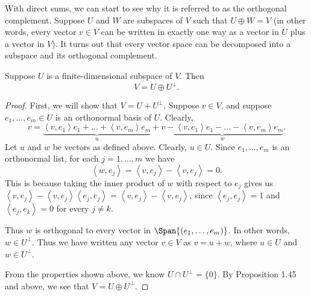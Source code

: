 \documentclass[math0540-lecture-notes.tex]{subfiles}
\begin{document}
With direct sums, we can start to see why it is referred to as the orthogonal complement. Suppose
$U$ and $W$ are subspaces of $V$ such that $U\oplus W=V$ (in other words, every vector $v\in V$ can
be written in exactly one way as a vector in $U$ plus a vector in $V$). It turns out that every
vector space can be decomposed into a subspace and its orthogonal complement.

\begin{theorem}{}
  Suppose $U$ is a finite-dimensional subspace of $V$. Then \[
    V=U\oplus U^{\bot}
  .\]
\end{theorem}
\begin{proof}[Proof]
  First, we will show that $V=U+U^{\bot}$. Suppose $v\in V$, and suppose $e_1,\ldots,e_m\in U$ is an
  orthonormal basis of $U$. Clearly, \[
    v=\underbrace{\left<v,e_1 \right> e_1+\ldots+\left<v,e_m \right> e_m}_u
    +\underbrace{v-\left<v,e_1 \right>e_1-\ldots-\left< v,e_m\right>e_m}_w
  .\] Let $u$ and $w$ be vectors as defined above. Clearly, $u\in U$. Since $e_1,\ldots,e_m$ is an
  orthonormal list, for each $j=1,\ldots,m$ we have \[
    \left<w,e_j \right> =\left<v,e_j \right> -\left<v,e_j \right> =0
  .\] This is because taking the inner product of $w$ with respect to $e_j$ gives us $\left<v,e_j
  \right> -\left<v,e_j \right> \left<e_j,e_j \right> =\left<v,e_j \right> -\left<v,e_j \right> $,
  since $\left<e_j,e_j \right> =1$ and $\left<e_j,e_k \right> =0$ for every $j\neq k$.

  Thus $w$ is orthogonal to every vector in $\Span{(e_1,\ldots,e_m)}$. In other words, $w\in
  U^{\bot}$. Thus we have written any vector $v\in V$ as $v=u+w$, where $u\in U$ and $w\in
  U^{\bot}$.

  From the properties shown above, we know $U\cap U^{\bot}=\{ 0 \}$. By Proposition 1.45 and above,
  we see that $V=U\oplus U^{\bot}$.
\end{proof}
\end{document}
